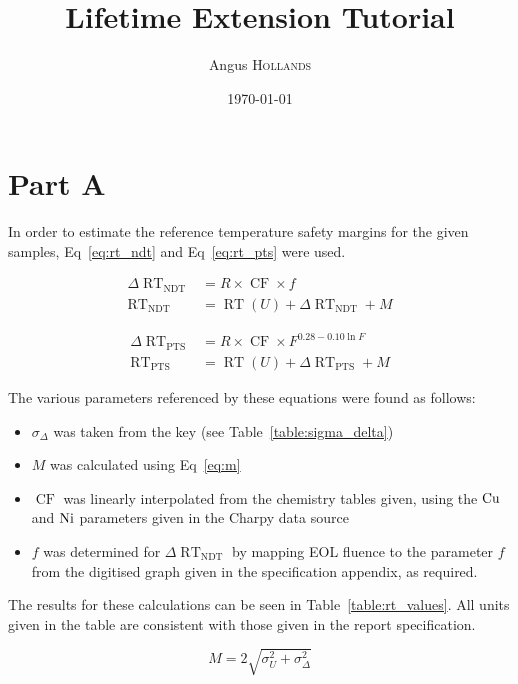 \documentclass{article}
\title{Lifetime Extension Tutorial} %
\author{Angus \textsc{Hollands}} %
\date{\today} %
\newcommand\RT{\operatorname{RT}}
\begin{document}
\maketitle %


\section{Part A}
In order to estimate the reference temperature safety margins for the given samples, Eq~\ref{eq:rt_ndt} and Eq~\ref{eq:rt_pts} were used.
    
    \begin{align}
    \label{eq:rt_ndt}
        \Delta{\RT}_{\operatorname{NDT}} &= R\times \operatorname{CF} \times f \\
        \RT_{\operatorname{NDT}} &= \RT(U) + \Delta\RT_{\operatorname{NDT}} + M
    \end{align}
    
    \begin{align}
    \label{eq:rt_pts}
        \Delta{\RT}_{\operatorname{PTS}} &= R\times \operatorname{CF} \times F^{0.28 - 0.10\ln{F}} \\
        \RT_{\operatorname{PTS}} &= \RT(U) + \Delta\RT_{\operatorname{PTS}} + M
    \end{align}
    
    The various parameters referenced by these equations were found as follows:
    \begin{itemize}
    \item $\sigma_\Delta$ was taken from the key (see Table~\ref{table:sigma_delta})
    \item $M$ was calculated using Eq~\ref{eq:m}
    \item $\operatorname{CF}$ was linearly interpolated from the chemistry tables given, using the $\ce{Cu}$ and $\ce{Ni}$ parameters given in the Charpy data source
    \item $f$ was determined for $\Delta{\RT}_{\operatorname{NDT}}$ by mapping EOL fluence to the parameter $f$ from the digitised graph given in the specification appendix, as required.
    \end{itemize}
    
    The results for these calculations can be seen in Table~\ref{table:rt_values}. All units given in the table are consistent with those given in the report specification.
    
    \begin{equation}
    \label{eq:m}
        M = 2\sqrt{\sigma_U^2+\sigma_\Delta^2}
    \end{equation}
\end{document}
